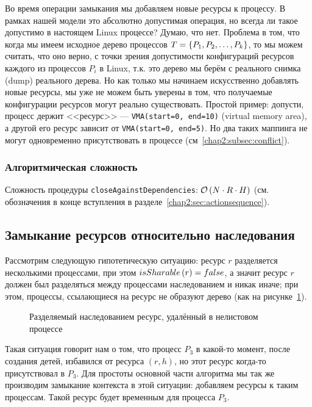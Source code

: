 \begin{note}
\label{note:badresourceconfig}
Во время операции замыкания мы добавляем новые ресурсы к процессу. В рамках нашей модели это абсолютно допустимая 
операция, но всегда ли такое допустимо в настоящем Linux процессе? Думаю, что нет. Проблема в том, что когда мы имеем 
исходное дерево процессов $T = \left\lbrace P_1, P_2, \ldots, P_k \right\rbrace$, то мы можем считать, что оно верно, с точки зрения 
допустимости конфигураций ресурсов каждого из процессов $P_i$ в Linux, т.к. это дерево мы берём с реального снимка 
(dump) реального дерева. Но как только мы начинаем искусственно добавлять новые ресурсы, мы уже не можем быть уверены 
в том, что получаемые конфигурации ресурсов могут реально существовать. Простой пример: допусти, процесс держит 
<<ресурс>> --- \texttt{VMA(start=0, end=10)} (virtual memory area), а другой его ресурс зависит от 
\texttt{VMA(start=0, end=5)}. Но два таких маппинга не могут одновременно присутствовать в процессе 
(см~\ref{chap2:subsec:conflict}).
\end{note}

\subsubsection*{Алгоритмическая сложность}

Сложность процедуры \texttt{closeAgainstDependencies}: $\mathcal{O}\left(N \cdot R \cdot H\right)$ (см. обозначения в конце вступления в разделе~\ref{chap2:sec:actionsequence}).

\subsection{Замыкание ресурсов относительно наследования}

Рассмотрим следующую гипотетическую ситуацию: ресурс $r$ разделяется несколькими процессами, при этом $isSharable\left( r \right) = false$, а значит ресурс $r$ должен был разделяться между процессами наследованием и никак иначе; при этом, процессы, ссылающиеся на ресурс не образуют дерево (как на рисунке~\ref{fig:inherithole}). 

\begin{figure}[ht!]
\centering
{}
\caption{Разделяемый наследованием ресурс, удалённый в нелистовом процессе}
\label{fig:inherithole}
\end{figure}

Такая ситуация говорит нам о том, что процесс $P_3$ в какой-то момент, после создания детей, избавился от ресурса $(r, h)$, но этот ресурс когда-то присутствовал в $P_3$. Для простоты основной части алгоритма мы так же производим замыкание контекста в этой ситуации: добавляем ресурсы к таким процессам. Такой ресурс будет временным для процесса $P_3$.


